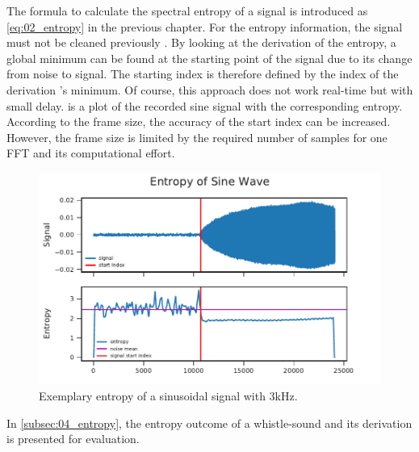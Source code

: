 The formula to calculate the spectral entropy of a signal is introduced as
\cref{eq:02_entropy} in the previous chapter.
For the entropy information, the signal must not be cleaned previously .
By looking at the derivation of the entropy, a global minimum can be found
at the starting point of the signal due to its change from noise to signal. 
The starting index is therefore defined by the index of the derivation 's minimum.
Of course, this approach does not work real-time  but with small delay.
 is a plot of the recorded sine signal with the corresponding
entropy.
According to the frame size, the accuracy of the start index can be increased.
However, the frame size is limited by the required number of samples for one \ac{FFT} and
its computational effort.
\begin{figure}[ht]
	\centering
		\includegraphics[]{figures/sine_entropy}
	\caption{Exemplary entropy of a sinusoidal signal with 3\si{\kilo\hertz}.}
	\label{fig:03_entropy}
\end{figure}
In \cref{subsec:04_entropy}, the entropy outcome of a whistle-sound
and its derivation is presented for evaluation. 

